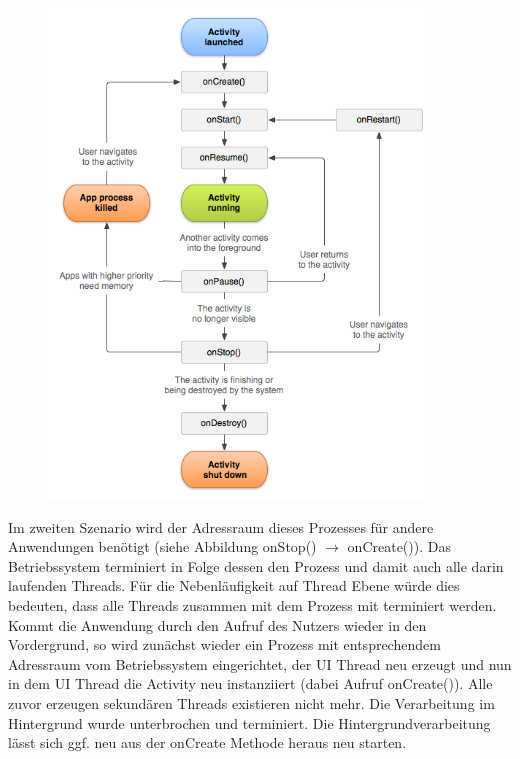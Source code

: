 \documentclass[12pt,oneside,a4paper,bibtotoc,liststotoc]{scrreprt}
\begin{document}
\begin{figure}[H]
  \begin{centering}
    \includegraphics[width=0.9\textwidth]{img/activity_lifecycle.png}
    \label{Activity_Lifecycle}
  \end{centering}
\end{figure}
Im zweiten Szenario wird der Adressraum dieses Prozesses für andere Anwendungen benötigt (siehe Abbildung onStop() $\rightarrow$  onCreate()). Das Betriebssystem terminiert in Folge dessen den Prozess und damit auch alle darin laufenden Threads. Für die Nebenläufigkeit auf Thread Ebene würde dies bedeuten, dass alle Threads zusammen mit dem Prozess mit terminiert werden. Kommt die Anwendung durch den Aufruf des Nutzers wieder in den Vordergrund, so wird zunächst wieder ein Prozess mit entsprechendem Adressraum vom Betriebssystem eingerichtet, der UI Thread neu erzeugt und nun in dem UI Thread die Activity neu instanziiert (dabei Aufruf onCreate()). Alle zuvor erzeugen sekundären Threads existieren nicht mehr. Die Verarbeitung im Hintergrund wurde unterbrochen und terminiert. Die Hintergrundverarbeitung lässt sich ggf. neu aus der onCreate Methode heraus neu starten.
\end{document}
